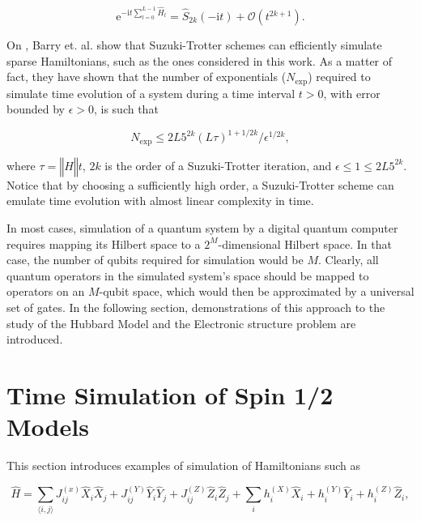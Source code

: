     \begin{equation}
      \mathrm{e}^{-\mathrm{i}t \sum_{l = 0}^{L-1} \hat{H}_l} = \hat{S}_{2k}(-\mathrm{i}t) + \mathcal{O}(t^{2k+1}).
    \end{equation}

    On \cite{BerryErrorBounds}, Barry et. al. show that Suzuki-Trotter schemes can efficiently simulate sparse Hamiltonians, such as the ones considered in this work. As a matter of fact, they have shown that the number of exponentials ($N_{\text{exp}}$) required to simulate time evolution of a system during a time interval $t > 0$, with error bounded by $\epsilon > 0$, is such that

    \begin{equation}
      N_{\text{exp}} \leq 2L5^{2k}(L\tau)^{1+1/2k}/\epsilon^{1/2k},
    \end{equation}

    \noindent where $\tau = \left\Vert \hat{H} \right\Vert t$, $2k$ is the order of a Suzuki-Trotter iteration, and $\epsilon \leq 1 \leq 2L5^{2k}$. Notice that by choosing a sufficiently high order, a Suzuki-Trotter scheme can emulate time evolution with almost linear complexity in time.

    In most cases, simulation of a quantum system by a digital quantum computer requires mapping its Hilbert space to a $2^M$-dimensional Hilbert space. In that case, the number of qubits required for simulation would be $M$. Clearly, all quantum operators in the simulated system's space should be mapped to operators on an $M$-qubit space, which would then be approximated by a universal set of gates. In the following section, demonstrations of this approach to the study of the Hubbard Model and the Electronic structure problem are introduced.

\section{Time Simulation of Spin 1/2 Models}
\label{sec:hubbard}
  
  This section introduces examples of simulation of Hamiltonians such as

  \begin{equation}
    \hat{H} = \sum_{\langle i,j \rangle} J_{ij}^{(x)} \hat{X}_i \hat{X}_j + J_{ij}^{(Y)} \hat{Y}_i \hat{Y}_j + J_{ij}^{(Z)} \hat{Z}_i \hat{Z}_j + \sum_i h_i^{(X)} \hat{X}_i + h_i^{(Y)} \hat{Y}_i + h_i^{(Z)} \hat{Z}_i,
    \label{eq:HeisenbergHamiltonian}
  \end{equation}

